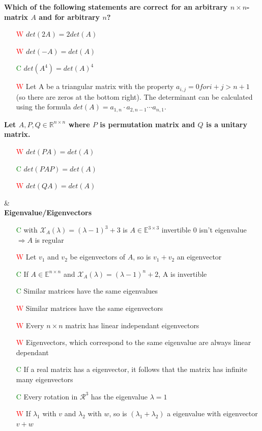 \documentclass[7pt,landscape, margin = 0.1mm]{article}
\begin{document}
\begin{multicols}{4}
\begin{flushleft}
\textbf{Which of the following statements are correct for an arbitrary $n \times n$-matrix $A $ and for arbitrary $ n$? }
\begin{itemize}
\item[\textcolor{red}{W}]$  det (2A) = 2 det(A)$
\item[\textcolor{red}{W}] $ det(-A) = det(A)$
\item[\textcolor{green}{C}] $det (A^4) = det(A)^4$
\item[\textcolor{red}{W}] Let A be a triangular matrix with the property $a_{i,j} = 0 for i + j > n + 1$ (so there are zeros at the
bottom right). The determinant can be calculated using the formula $det(A) = a_{1,n} \cdot a_{2,n−1} \cdots a_{n,1}$.
\end{itemize}
\hspace{3mm}
\textbf{Let $A,P,Q  \in \mathbb{R}^{n \times n} $ where $P$ is permutation matrix and $Q$ is a unitary matrix. }
\begin{itemize}
\item[\textcolor{red}{W}] $det(PA) = det(A)$
\item[\textcolor{green}{C}] $det(PAP) = det(A) $
\item[\textcolor{red}{W}] $det(QA) = det(A)$

\end{itemize}

\hspace{3mm}
\hline & \\[3mm]
\scriptsize
\textbf{Eigenvalue/Eigenvectors}
\tiny \\
\begin{itemize}
\item[\textcolor{green}{C}] with $ \mathcal{X}_A(\lambda) = (\lambda -1)^3 +3 $ is $A \in \mathbb{E}^{3 \times 3}$ invertible 
\textcolor{Emerald}{0 isn't eigenvalue $\Rightarrow  A$ is regular }

\item[\textcolor{red}{W}] Let $v_1 $ and $v_2 $ be eigenvectors of $A$, so is $v_1+v_2$ an eigenvector
\item[\textcolor{green}{C}] If $A  \in \mathbb{E}^{n \times n} $ and $\mathcal{X}_A(\lambda) = (\lambda-1)^n+2 $, A is invertible
\item[\textcolor{green}{C}] Similar matrices have the same eigenvalues
\item[\textcolor{red}{W}] Similar matrices have the same eigenvectors
\item[\textcolor{red}{W}] Every $n \times n $ matrix has linear independant eigenvectors
\item[\textcolor{red}{W}] Eigenvectors, which correspond to the same eigenvalue are always linear dependant
\item[\textcolor{green}{C}] If a real matrix has a eigenvector, it follows that the matrix has infinite many eigenvectors
\item[\textcolor{green}{C}] Every rotation in $\mathcal{R}^3 $ has the eigenvalue $\lambda = 1 $
\item[\textcolor{red}{W}] If $\lambda_1$ with $v$ and $\lambda_2$ with $w$, so is $(\lambda_1 + \lambda_2)$ a eigenvalue with eigenvector $v+w$


\end{itemize}
\end{flushleft}
\end{multicols}
\end{document}

